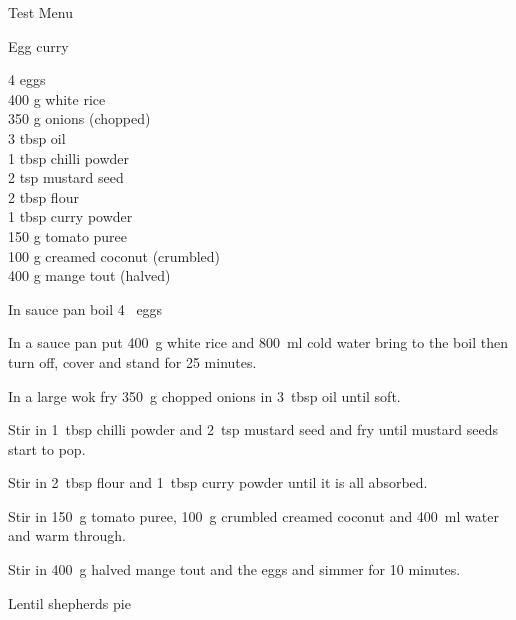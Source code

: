 \begin{menu}{Test Menu}
\begin{recipe}{2}{Egg curry}
		\begin{ingredients}
		4  eggs  \\
	400 g white rice  \\
	350 g onions (chopped) \\
	3 tbsp oil  \\
	1 tbsp chilli powder  \\
	2 tsp mustard seed  \\
	2 tbsp flour  \\
	1 tbsp curry powder  \\
	150 g tomato puree  \\
	100 g creamed coconut (crumbled) \\
	400 g mange tout (halved) \\
	
		\end{ingredients}
	
	
    \begin{instructions}
    \item 
        In sauce pan boil
        4~  eggs\item 
      In a
      sauce pan
      put
      400~g  white rice
      and
      800~ml  cold water
      bring to the boil then turn off, cover and stand for 25 minutes.
    \item 
        In a large wok fry
        350~g chopped onions
        in
        3~tbsp  oil
        until soft.
      \item 
        Stir in 1~tbsp  chilli powder
        and
        2~tsp  mustard seed
        and fry until mustard seeds start to pop.
      \item 
        Stir in
        2~tbsp  flour
        and
        1~tbsp  curry powder
        until it is all absorbed.
      \item 
        Stir in
        150~g  tomato puree,
        100~g crumbled creamed coconut
        and
        400~ml  water
        and warm through.
      \item 
        Stir in
        400~g halved mange tout
        and the eggs
        and simmer for 10 minutes.
      
    \end{instructions}
    \end{recipe}%
  
    \begin{recipe}{2}{Lentil shepherds pie}%
    

\end{recipe}
\end{menu}
